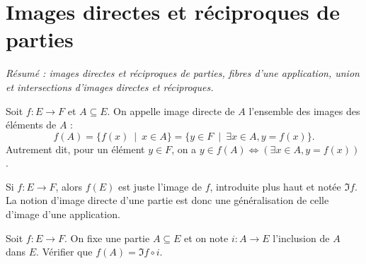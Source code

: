 \section{Images directes et réciproques de parties}

\emph{Résumé : images directes et réciproques de parties, fibres d'une application, union et intersections d'images directes et réciproques.}


\begin{definition}
Soit $f : E\to F$ et $A\subseteq E$. On appelle image directe de $A$ l'ensemble des images des éléments de $A$ :
\[f(A) = \{f(x)\:\mid\: x\in A\} = \{y\in F \:\mid\: \exists x\in A, y=f(x)\}.\]
Autrement dit, pour un élément $y\in F$, on a $y\in f(A) \iff \left(\exists x\in A, y=f(x)\right)$.
\end{definition}

\begin{exemple}
Si $f : E\to F$, alors $f(E)$ est juste l'image de $f$, introduite plus haut et notée $\Im f$. La notion d'image directe d'une partie est donc une généralisation de celle d'image d'une application.
\end{exemple}

\begin{exercice}
Soit $f : E\to F$. On fixe une partie $A\subseteq E$ et on note $i : A\to E$ l'inclusion de $A$ dans $E$. Vérifier que $f(A) = \Im f\circ i$.
\end{exercice}


